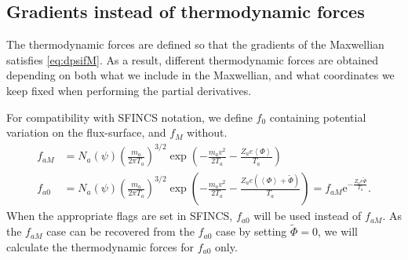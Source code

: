 \documentclass[12pt, a4paper]{article}
\newcommand{\e}{\ensuremath{\mathrm{e}}}
\newcommand{\lang}{\left\langle}
\newcommand{\rang}{\right\rangle}
\begin{document}
\subsection{Gradients instead of thermodynamic forces}
The thermodynamic forces are defined so that the gradients of the Maxwellian satisfies \eqref{eq:dpsifM}. As a result, different thermodynamic forces are obtained depending on both what we include in the Maxwellian, and what coordinates we keep fixed when performing the partial derivatives.

For compatibility with SFINCS notation, we define $f_0$ containing potential variation on the flux-surface, and $f_M$ without.
\begin{align}
  f_{aM} &= N_a(\psi) \left(\frac{m_a}{2\pi T_a} \right)^{3/2} \exp{\left(-\frac{m_a v^2}{2T_a} -\frac{Z_a e\lang \Phi \rang}{T_a}\right)} \\
  f_{a0} &= N_a(\psi) \left(\frac{m_a}{2\pi T_a} \right)^{3/2} \exp{\left(-\frac{m_a v^2}{2T_a} - \frac{Z_a e(\lang \Phi \rang + \tilde{\Phi})}{T_a}\right)} = f_{aM} \e^{- \frac{Z_a e\tilde{\Phi}}{T_a}}.
\end{align}
When the appropriate flags are set in SFINCS, $f_{a0}$ will be used instead of $f_{aM}$. As the $f_{aM}$ case can be recovered from the $f_{a0}$ case by setting $\tilde{\Phi} = 0$, we will calculate the thermodynamic forces for $f_{a0}$ only. 
\end{document}
